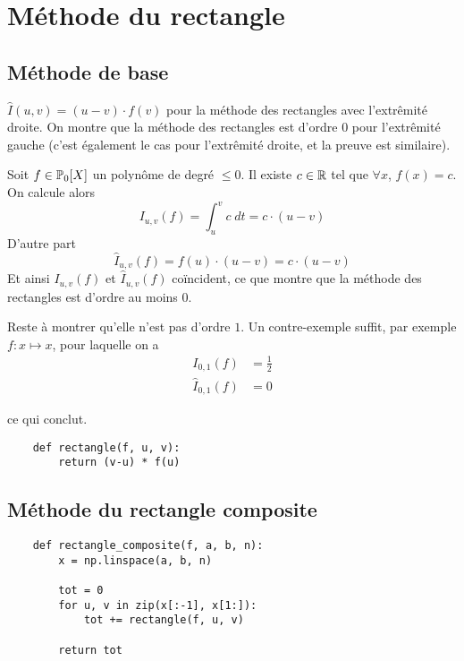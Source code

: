 
\section{Méthode du rectangle}

\subsection{Méthode de base}
\quessques $ \hat{I}(u, v) = (u-v) \cdot f(v) $ pour la méthode des rectangles avec l'extrêmité droite.
\ssques On montre que la méthode des rectangles est d'ordre $ 0 $ pour l'extrêmité gauche (c'est également le cas pour l'extrêmité droite, et la preuve est similaire). 

Soit $ f \in \P_0[X] $ un polynôme de degré $ \leq 0 $. Il existe $ c \in \R $ tel que $ \forall x $, $ f(x) = c $. On calcule alors \[
    I_{u, v}(f) = \int_{u}^{v} c \; dt = c \cdot (u-v)
\]
D'autre part \[
    \hat{I}_{u, v}(f) = f(u) \cdot (u-v) = c \cdot (u-v)
\]
Et ainsi $ I_{u, v}(f) $ et $ \hat{I}_{u, v}(f) $ coïncident, ce que montre que la méthode des rectangles est d'ordre au moins $ 0 $.

Reste à montrer qu'elle n'est pas d'ordre $ 1 $. Un contre-exemple suffit, par exemple $ f : x \mapsto x $, pour laquelle on a 
\begin{align*}
    I_{0, 1}(f) &= \frac{1}{2}\\
    \hat{I}_{0, 1}(f) &= 0
\end{align*}

ce qui conclut.

\quessques 
\begin{verbatim}
    def rectangle(f, u, v):
        return (v-u) * f(u)
\end{verbatim}


\subsection{Méthode du rectangle composite}

\quessques 

\begin{verbatim}
    def rectangle_composite(f, a, b, n):
        x = np.linspace(a, b, n)

        tot = 0
        for u, v in zip(x[:-1], x[1:]):
            tot += rectangle(f, u, v)

        return tot
\end{verbatim}

